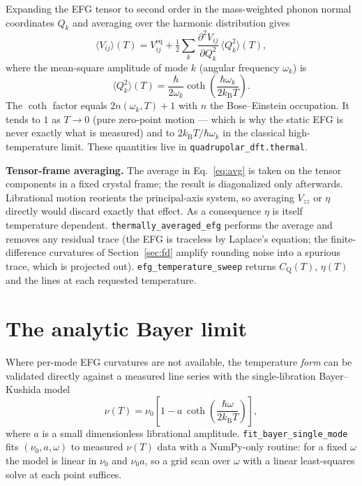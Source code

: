 \documentclass[11pt,oneside]{report}
\newcommand{\code}[1]{{\small\nolinkurl{#1}}}
\newcommand{\Cq}{C_{\mathrm{Q}}}
\newcommand{\Vzz}{V_{zz}}
\begin{document}
Expanding the EFG tensor to second order in the mass-weighted phonon normal
coordinates $Q_k$ and averaging over the harmonic distribution gives
\begin{equation}
\langle V_{ij}\rangle(T) = V_{ij}^{\mathrm{eq}}
  + \tfrac{1}{2}\sum_k \frac{\partial^2 V_{ij}}{\partial Q_k^2}\,
  \langle Q_k^2\rangle(T),
\label{eq:avg}
\end{equation}
where the mean-square amplitude of mode $k$ (angular frequency $\omega_k$) is
\begin{equation}
\langle Q_k^2\rangle(T) = \frac{\hbar}{2\omega_k}
  \coth\!\left(\frac{\hbar\omega_k}{2 k_{\mathrm B} T}\right).
\label{eq:q2}
\end{equation}
The $\coth$ factor equals $2 n(\omega_k,T) + 1$ with $n$ the Bose--Einstein
occupation. It tends to $1$ as $T\to 0$ (pure zero-point motion --- which is why
the static EFG is never exactly what is measured) and to
$2 k_{\mathrm B} T / \hbar\omega_k$ in the classical high-temperature limit. These
quantities live in \code{quadrupolar\_dft.thermal}.

\textbf{Tensor-frame averaging.} The average in Eq.~\eqref{eq:avg} is taken on the
tensor components in a fixed crystal frame; the result is diagonalized only
afterwards. Librational motion reorients the principal-axis system, so averaging
$\Vzz$ or $\eta$ directly would discard exactly that effect. As a consequence
$\eta$ is itself temperature dependent. \code{thermally\_averaged\_efg} performs
the average and removes any residual trace (the EFG is traceless by Laplace's
equation; the finite-difference curvatures of Section~\ref{sec:fd} amplify
rounding noise into a spurious trace, which is projected out).
\code{efg\_temperature\_sweep} returns $\Cq(T)$, $\eta(T)$ and the lines at each
requested temperature.

\section{The analytic Bayer limit}

Where per-mode EFG curvatures are not available, the temperature \emph{form} can
be validated directly against a measured line series with the single-libration
Bayer--Kushida model
\begin{equation}
\nu(T) = \nu_0\left[1 - a\,\coth\!\left(\frac{\hbar\omega}{2 k_{\mathrm B}T}\right)\right],
\label{eq:bayer}
\end{equation}
where $a$ is a small dimensionless librational amplitude.
\code{fit\_bayer\_single\_mode} fits $(\nu_0, a, \omega)$ to measured $\nu(T)$
data with a NumPy-only routine: for a fixed $\omega$ the model is linear in
$\nu_0$ and $\nu_0 a$, so a grid scan over $\omega$ with a linear least-squares
solve at each point suffices.
\end{document}
